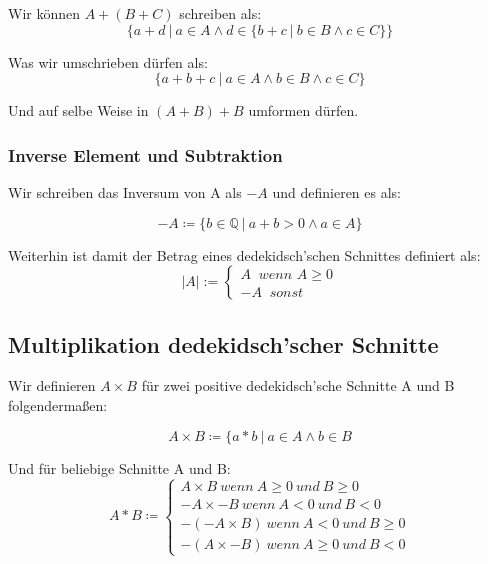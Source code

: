 \documentclass[12pt]{article}
\begin{document}
    Wir können $A + (B + C)$ schreiben als:
    \[\{a+d \mspace{4mu} | \mspace{4mu} a \in A \land d \in \{b + c \mspace{4mu} | \mspace{4mu} b \in B \land c \in C\}\}\]

    Was wir umschrieben dürfen als:
    \[\{a+b+c \mspace{4mu} | \mspace{4mu} a \in A \land b \in B \land c \in C\}\]

    Und auf selbe Weise in $(A + B) + B$ umformen dürfen.


    \subsubsection{Inverse Element und Subtraktion}

    Wir schreiben das Inversum von A als $-A$ und definieren es als:

    \[-A \coloneqq \{b \in \mathbb{Q} \mspace{4mu} | \mspace{4mu} a + b > 0 \land a \in A\}\]



    Weiterhin ist damit der Betrag eines dedekidsch'schen Schnittes definiert als:
    \[|A| := \begin{cases}A \mspace{10mu} wenn \mspace{6mu} A \ge 0 \\ -A \mspace{10mu} sonst\end{cases}\]

    \subsection{Multiplikation dedekidsch'scher Schnitte}

    Wir definieren $A \times B$ für zwei positive dedekidsch'sche Schnitte A und B folgendermaßen:

    \[A \times B \coloneqq \{a * b \mspace{4mu} | \mspace{4mu} a \in A \land b \in B\]


    Und für beliebige Schnitte A und B:
    \[
        A * B \coloneqq
        \begin{cases}
            A \times B \mspace{4mu} wenn \mspace{4mu} A \ge 0 \mspace{4mu} und \mspace{4mu} B \ge 0 \\
            -A \times -B \mspace{4mu} wenn \mspace{4mu} A < 0 \mspace{4mu} und \mspace{4mu} B < 0 \\
            -(-A \times B) \mspace{4mu} wenn \mspace{4mu} A < 0 \mspace{4mu} und \mspace{4mu} B \ge 0  \\
            -(A \times -B) \mspace{4mu} wenn \mspace{4mu} A \ge 0 \mspace{4mu} und \mspace{4mu} B < 0
        \end{cases}
    \]
\end{document}
